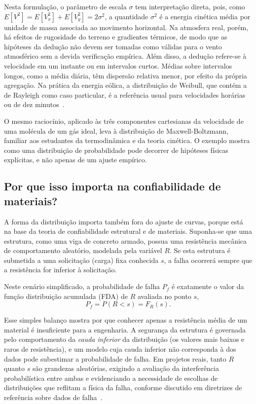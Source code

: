 Nesta formulação, o parâmetro de escala $\sigma$ tem interpretação direta, pois, como $E[V^2] = E[V_x^2] + E[V_y^2] = 2\sigma^2$, a quantidade $\sigma^2$ é a energia cinética média por unidade de massa associada ao movimento horizontal. Na atmosfera real, porém, há efeitos de rugosidade do terreno e gradientes térmicos, de modo que as hipóteses da dedução não devem ser tomadas como válidas para o vento atmosférico sem a devida verificação empírica. Além disso, a dedução refere-se à velocidade em um instante ou em intervalos curtos. Médias sobre intervalos longos, como a média diária, têm dispersão relativa menor, por efeito da própria agregação. Na prática da energia eólica, a distribuição de Weibull, que contém a de Rayleigh como caso particular, é a referência usual para velocidades horárias ou de dez minutos~\cite{justus1978,carta2009}.

O mesmo raciocínio, aplicado às três componentes cartesianas da velocidade de uma molécula de um gás ideal, leva à distribuição de Maxwell-Boltzmann, familiar aos estudantes da termodinâmica e da teoria cinética. O exemplo mostra como uma distribuição de probabilidade pode decorrer de hipóteses físicas explícitas, e não apenas de um ajuste empírico.

\subsection{Por que isso importa na confiabilidade de materiais?}

A forma da distribuição importa também fora do ajuste de curvas, porque está na base da teoria de confiabilidade estrutural e de materiais. Suponha-se que uma estrutura, como uma viga de concreto armado, possua uma resistência mecânica de comportamento aleatório, modelada pela variável $R$. Se esta estrutura é submetida a uma solicitação (carga) fixa conhecida $s$, a falha ocorrerá sempre que a resistência for inferior à solicitação.

Neste cenário simplificado, a probabilidade de falha $P_f$ é exatamente o valor da função distribuição acumulada (FDA) de $R$ avaliada no ponto $s$,
\begin{equation}
    P_f = P(R < s) = F_R(s).
\end{equation}

Esse simples balanço mostra por que conhecer apenas a resistência média de um material é insuficiente para a engenharia. A segurança da estrutura é governada pelo comportamento da \textit{cauda inferior} da distribuição (os valores mais baixos e raros de resistência), e um modelo cuja cauda inferior não corresponda à dos dados pode subestimar a probabilidade de falha. Em projetos reais, tanto $R$ quanto $s$ são grandezas aleatórias, exigindo a avaliação da interferência probabilística entre ambas e evidenciando a necessidade de escolhas de distribuições que reflitam a física da falha, conforme discutido em diretrizes de referência sobre dados de falha~\cite{nist2012}.

